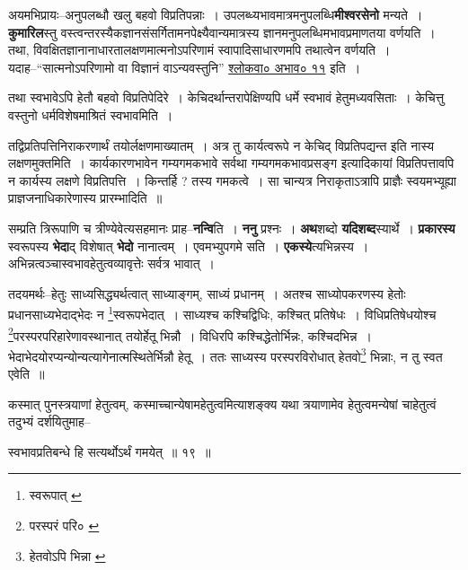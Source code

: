\documentclass[article,12pt,a4paper]{memoir}
\begin{document}
	  \pstart अयमभिप्रायः--अनुपलब्धौ खलु बहवो विप्रतिपन्नाः । उपलब्ध्यभावमात्रमनुपलब्धि\textbf{मीश्वरसेनो} मन्यते । \textbf{कुमारिल}स्तु वस्त्वन्तरस्यैकज्ञानसंसर्गितामनपेक्ष्यैवान्यमात्रस्य ज्ञानमनुपलब्धिमभावप्रमाणतया वर्णयति । तथा, विवक्षितज्ञानानाधारतालक्षणमात्मनोऽपरिणामं स्वापादिसाधारणम\leavevmode{}पि तथात्वेन वर्णयति । यदाह--“सात्मनोऽपरिणामो वा विज्ञानं वाऽन्यवस्तुनि” \href{http://http://sarit.indology.info/?cref=śv.abhāva.11}{श्लोकवा० अभाव० ११} इति ।
	\pend
      

	  \pstart तथा स्वभावेऽपि हेतौ बहवो विप्रतिपेदिरे । केचिदर्थान्तरापेक्षिण्यपि धर्मे स्वभावं हेतुमध्यवसिताः । केचित्तु वस्तुनो धर्मविशेषमाश्रितं स्वभावमिति ।
	\pend
      

	  \pstart तद्विप्रतिपत्तिनिराकरणार्थं तयोर्लक्षणमाख्यातम् । अत्र तु कार्यत्वरूपे न केचिद् विप्रतिपद्यन्त इति नास्य लक्षणमुक्तमिति । कार्यकारणभावेन गम्यगमकभावे सर्वथा गम्यगमकभावप्रसङ्ग इत्यादिकायां विप्रतिपत्तावपि न कार्यस्य लक्षणे विप्रतिपत्ति । किन्तर्हि ? तस्य गमकत्वे । सा चान्यत्र निराकृताऽत्रापि प्राज्ञैः स्वयमभ्यूह्या प्राज्ञजनाधिकारेणास्य प्रारम्भादिति ॥
	\pend
      

	  \pstart सम्प्रति त्रिरूपाणि च त्रीण्येवेत्यसहमानः प्राह--\textbf{नन्वि}ति । \textbf{ननु} प्रश्नः । \textbf{अथ}शब्दो \textbf{यदिशब्द}स्यार्थे । \textbf{प्रकारस्य} स्वरूपस्य \textbf{भेदा}द् विशेषात् \textbf{भेदो} नानात्वम् । एवमभ्युपगमे सति । \textbf{एकस्ये}त्यभिन्नस्य । अभिन्नत्वञ्चास्वभावहेतुत्वव्यावृत्तेः सर्वत्र भावात् ।
	\pend
      \leavevmode{}
	  \bigskip
	  \begingroup
	

	  \pstart तदयमर्थः--हेतुः साध्यसिद्ध्यर्थत्वात् साध्याङ्गम्, साध्यं प्रधानम् । अतश्च साध्योपकरणस्य हेतोः प्रधानसाध्यभेदाद्भेदः न \footnote{स्वरूपात् \cite{dp-msC}}स्वरूपभेदात् । साध्यश्च कश्चिद्विधिः, कश्चित् प्रतिषेधः । विधिप्रतिषेधयोश्च \footnote{परस्परं परि० \cite{dp-msB} \cite{dp-msD}}परस्परपरिहारेणावस्थानात् तयोर्हेतू भिन्नौ । विधिरपि कश्चिद्धेतोर्भिन्नः, कश्चिदभिन्न । भेदाभेदयोरप्यन्योन्यत्यागेनात्मस्थितेर्भिन्नौ हेतू । ततः साध्यस्य परस्परविरोधात् हेतवो\footnote{हेतवोऽपि भिन्ना \cite{dp-msB}} भिन्नाः, न तु स्वत एवेति ॥
	\pend
       

	  \pstart कस्मात् पुनस्त्रयाणां हेतुत्वम्, कस्माच्चान्येषामहेतुत्वमित्याशङ्क्य यथा त्रयाणामेव हेतुत्वमन्येषां चाहेतुत्वं तदुभ्यं दर्शयितुमाह--
	\pend
      
	  \endgroup
	
	  \bigskip
	  \begingroup
	

	  \pstart स्वभावप्रतिबन्धे हि सत्यर्थोऽर्थं गमयेत् ॥ १९ ॥
	\pend
      
\end{document}
